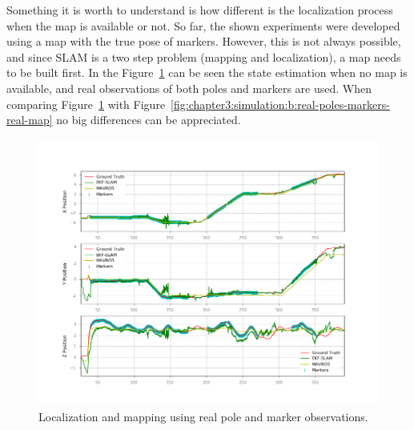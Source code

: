 Something it is worth to understand is how different is the localization process when the map is available or not. So far, the shown experiments were developed using a map with the true pose of markers. However, this is not always possible, and since \ac{SLAM} is a two step problem (mapping and localization), a map needs to be built first. In the Figure~\ref{fig:chapter3:simulation:b:real-poles-markers-no-map} can be seen the state estimation when no map is available, and real observations of both poles and markers are used. When comparing Figure~\ref{fig:chapter3:simulation:b:real-poles-markers-no-map} with Figure~\ref{fig:chapter3:simulation:b:real-poles-markers-real-map} no big differences can be appreciated.\\
\begin{figure}
    \centering
    \includegraphics[width=\textwidth]{Images/fig22-true-poles-markers-nomap.png}
    \caption{Localization and mapping using real pole and marker observations.}
    \label{fig:chapter3:simulation:b:real-poles-markers-no-map}
\end{figure}

